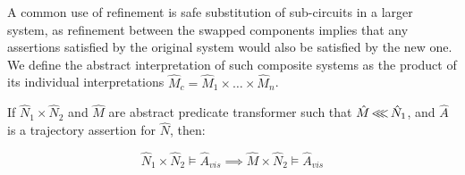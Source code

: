 A common use of refinement is safe substitution of sub-circuits in a larger system, as refinement between the swapped components implies that any assertions satisfied by the original system would also be satisfied by the new one. We define the abstract interpretation of such composite systems as the product of its individual interpretations $\hat M_{c} = \hat M_{1} \times \ldots \times \hat M_{n}$.

\begin{corollary}
\label{thm:refinement-product}
If $\hat N_{1} \times \hat N_{2}$ and $\hat M$ are abstract predicate transformer such that $\hat M \operatorname{\lll} \hat N_{1}$, and $\hat A$ is a trajectory assertion for $\hat N$, then:

\begin{equation*}
\hat N_{1} \times \hat N_{2} \models \hat A_{vis} \implies \hat M \times \hat N_{2} \models \hat A_{vis}
\end{equation*}
\end{corollary}



